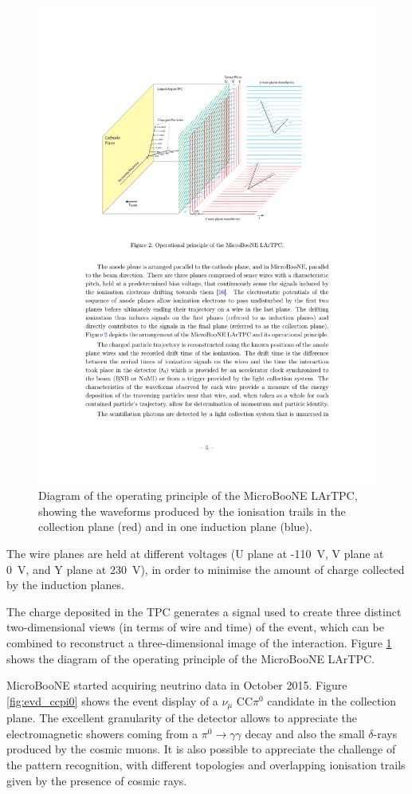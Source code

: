 \begin{figure}[htbp]
    \centering
    \includegraphics[width=0.7\linewidth]{figures/lartpc_diagram.pdf}
    \caption{Diagram of the operating principle of the MicroBooNE LArTPC, showing the waveforms produced by the ionisation trails in the collection plane (red) and in one induction plane (blue).}
    \label{fig:lartpc_diagram}
\end{figure}

The wire planes are held at different voltages (U plane at -110~V, V plane at 0~V, and Y plane at 230~V), in order to minimise the amount of charge collected by the induction planes.

The charge deposited in the TPC generates a signal used to create three distinct two-dimensional views (in terms of wire and time) of the event, which can be combined to reconstruct a three-dimensional image of the interaction. Figure \ref{fig:lartpc_diagram} shows the diagram of the operating principle of the MicroBooNE LArTPC.

MicroBooNE started acquiring neutrino data in October 2015. Figure \ref{fig:evd_ccpi0} shows the event display of a $\nu_{\mu}$ CC$\pi^0$ candidate in the collection plane. The excellent granularity of the detector allows to appreciate the electromagnetic showers coming from a $\pi^0\rightarrow\gamma\gamma$ decay and also the small $\delta$-rays produced by the cosmic muons. It is also possible to appreciate the challenge of the pattern recognition, with different topologies and overlapping ionisation trails given by the presence of cosmic rays. 

